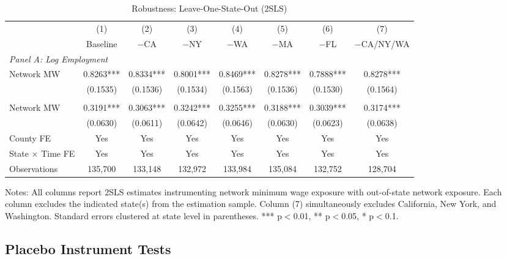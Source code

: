 \documentclass[12pt]{article}
\newenvironment{figurenotes}{\par\vspace{0.5em}\footnotesize\noindent}{\par}
\begin{document}
\begin{table}[H]
\centering
\caption{Robustness: Leave-One-State-Out (2SLS)}
\label{tab:robustB2}
\footnotesize
\setlength{\tabcolsep}{4pt}
\begin{tabular}{l ccccccc}
\toprule
 & (1) & (2) & (3) & (4) & (5) & (6) & (7) \\
 & Baseline & $-$CA & $-$NY & $-$WA & $-$MA & $-$FL & $-$CA/NY/WA \\
\midrule
\multicolumn{8}{l}{\textit{Panel A: Log Employment}} \\[3pt]
Network MW & 0.8263*** & 0.8334*** & 0.8001*** & 0.8469*** & 0.8278*** & 0.7888*** & 0.8278*** \\
 & (0.1535) & (0.1536) & (0.1534) & (0.1563) & (0.1536) & (0.1530) & (0.1564) \\
\addlinespace
\multicolumn{8}{l}{\textit{Panel B: Log Earnings}} \\[3pt]
Network MW & 0.3191*** & 0.3063*** & 0.3242*** & 0.3255*** & 0.3188*** & 0.3039*** & 0.3174*** \\
 & (0.0630) & (0.0611) & (0.0642) & (0.0646) & (0.0630) & (0.0623) & (0.0638) \\
\midrule
County FE & Yes & Yes & Yes & Yes & Yes & Yes & Yes \\
State $\times$ Time FE & Yes & Yes & Yes & Yes & Yes & Yes & Yes \\
Observations & 135,700 & 133,148 & 132,972 & 133,984 & 135,084 & 132,752 & 128,704 \\
\bottomrule
\end{tabular}
\begin{figurenotes}
Notes: All columns report 2SLS estimates instrumenting network minimum wage exposure with
out-of-state network exposure. Each column excludes the indicated state(s) from the estimation
sample. Column (7) simultaneously excludes California, New York, and Washington.
Standard errors clustered at state level in parentheses.
*** p$<$0.01, ** p$<$0.05, * p$<$0.1.
\end{figurenotes}
\end{table}

\subsection{Placebo Instrument Tests}
\end{document}
